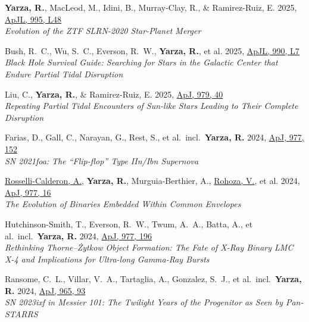 \item \textbf{Yarza, R.}, MacLeod, M., Idini, B., Murray-Clay, R., \& Ramirez-Ruiz, E. 2025, \href{https://ui.adsabs.harvard.edu/abs/2025ApJ...995L..48Y}{ApJL, 995, L48}\\\textit{Evolution of the ZTF SLRN-2020 Star-Planet Merger}

\item Bush, R.~C., Wu, S.~C., Everson, R.~W., \textbf{Yarza, R.}, et al. 2025, \href{https://ui.adsabs.harvard.edu/abs/2025ApJ...990L...7B}{ApJL, 990, L7}\\\textit{Black Hole Survival Guide: Searching for Stars in the Galactic Center that Endure Partial Tidal Disruption}

\item Liu, C., \textbf{Yarza, R.}, \& Ramirez-Ruiz, E. 2025, \href{https://ui.adsabs.harvard.edu/abs/2025ApJ...979...40L}{ApJ, 979, 40}\\\textit{Repeating Partial Tidal Encounters of Sun-like Stars Leading to Their Complete Disruption}

\item Farias, D., Gall, C., Narayan, G., Rest, S., et al.\ incl.\ \textbf{Yarza, R.} 2024, \href{https://ui.adsabs.harvard.edu/abs/2024ApJ...977..152F}{ApJ, 977, 152}\\\textit{SN 2021foa: The ``Flip-flop'' Type IIn/Ibn Supernova}

\item \underline{Rosselli-Calderon, A.}, \textbf{Yarza, R.}, Murguia-Berthier, A., \underline{Rohoza, V.}, et al. 2024, \href{https://ui.adsabs.harvard.edu/abs/2024ApJ...977...16R}{ApJ, 977, 16}\\\textit{The Evolution of Binaries Embedded Within Common Envelopes}

\item Hutchinson-Smith, T., Everson, R.~W., Twum, A.~A., Batta, A., et al.\ incl.\ \textbf{Yarza, R.} 2024, \href{https://ui.adsabs.harvard.edu/abs/2024ApJ...977..196H}{ApJ, 977, 196}\\\textit{Rethinking Thorne--\.{Z}ytkow Object Formation: The Fate of X-Ray Binary LMC X-4 and Implications for Ultra-long Gamma-Ray Bursts}

\item Ransome, C.~L., Villar, V.~A., Tartaglia, A., Gonzalez, S.~J., et al.\ incl.\ \textbf{Yarza, R.} 2024, \href{https://ui.adsabs.harvard.edu/abs/2024ApJ...965...93R}{ApJ, 965, 93}\\\textit{SN 2023ixf in Messier 101: The Twilight Years of the Progenitor as Seen by Pan-STARRS}

